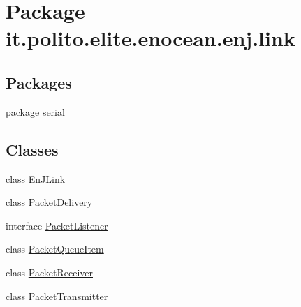 \hypertarget{namespaceit_1_1polito_1_1elite_1_1enocean_1_1enj_1_1link}{}\section{Package it.\+polito.\+elite.\+enocean.\+enj.\+link}
\label{namespaceit_1_1polito_1_1elite_1_1enocean_1_1enj_1_1link}
\subsection*{Packages}
\begin{DoxyCompactItemize}
\item 
package \hyperlink{namespaceit_1_1polito_1_1elite_1_1enocean_1_1enj_1_1link_1_1serial}{serial}
\end{DoxyCompactItemize}
\subsection*{Classes}
\begin{DoxyCompactItemize}
\item 
class \hyperlink{classit_1_1polito_1_1elite_1_1enocean_1_1enj_1_1link_1_1_en_j_link}{En\+J\+Link}
\item 
class \hyperlink{classit_1_1polito_1_1elite_1_1enocean_1_1enj_1_1link_1_1_packet_delivery}{Packet\+Delivery}
\item 
interface \hyperlink{interfaceit_1_1polito_1_1elite_1_1enocean_1_1enj_1_1link_1_1_packet_listener}{Packet\+Listener}
\item 
class \hyperlink{classit_1_1polito_1_1elite_1_1enocean_1_1enj_1_1link_1_1_packet_queue_item}{Packet\+Queue\+Item}
\item 
class \hyperlink{classit_1_1polito_1_1elite_1_1enocean_1_1enj_1_1link_1_1_packet_receiver}{Packet\+Receiver}
\item 
class \hyperlink{classit_1_1polito_1_1elite_1_1enocean_1_1enj_1_1link_1_1_packet_transmitter}{Packet\+Transmitter}
\end{DoxyCompactItemize}

